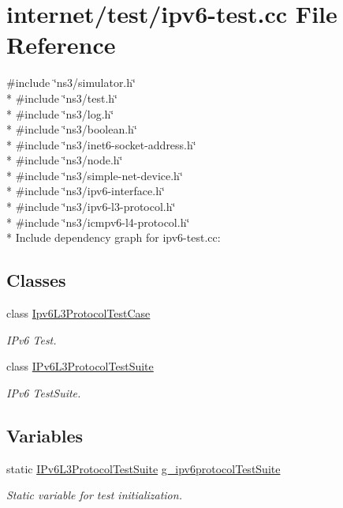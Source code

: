 \hypertarget{ipv6-test_8cc}{}\section{internet/test/ipv6-\/test.cc File Reference}
\label{ipv6-test_8cc}
{\ttfamily \#include \char`\"{}ns3/simulator.\+h\char`\"{}}\\*
{\ttfamily \#include \char`\"{}ns3/test.\+h\char`\"{}}\\*
{\ttfamily \#include \char`\"{}ns3/log.\+h\char`\"{}}\\*
{\ttfamily \#include \char`\"{}ns3/boolean.\+h\char`\"{}}\\*
{\ttfamily \#include \char`\"{}ns3/inet6-\/socket-\/address.\+h\char`\"{}}\\*
{\ttfamily \#include \char`\"{}ns3/node.\+h\char`\"{}}\\*
{\ttfamily \#include \char`\"{}ns3/simple-\/net-\/device.\+h\char`\"{}}\\*
{\ttfamily \#include \char`\"{}ns3/ipv6-\/interface.\+h\char`\"{}}\\*
{\ttfamily \#include \char`\"{}ns3/ipv6-\/l3-\/protocol.\+h\char`\"{}}\\*
{\ttfamily \#include \char`\"{}ns3/icmpv6-\/l4-\/protocol.\+h\char`\"{}}\\*
Include dependency graph for ipv6-\/test.cc\+:
\subsection*{Classes}
\begin{DoxyCompactItemize}
\item 
class \hyperlink{classIpv6L3ProtocolTestCase}{Ipv6\+L3\+Protocol\+Test\+Case}
\begin{DoxyCompactList}\small\item\em I\+Pv6 Test. \end{DoxyCompactList}\item 
class \hyperlink{classIPv6L3ProtocolTestSuite}{I\+Pv6\+L3\+Protocol\+Test\+Suite}
\begin{DoxyCompactList}\small\item\em I\+Pv6 Test\+Suite. \end{DoxyCompactList}\end{DoxyCompactItemize}
\subsection*{Variables}
\begin{DoxyCompactItemize}
\item 
static \hyperlink{classIPv6L3ProtocolTestSuite}{I\+Pv6\+L3\+Protocol\+Test\+Suite} \hyperlink{ipv6-test_8cc_a78b6652ce5676068fcc94b576d378659}{g\+\_\+ipv6protocol\+Test\+Suite}
\begin{DoxyCompactList}\small\item\em Static variable for test initialization. \end{DoxyCompactList}\end{DoxyCompactItemize}



